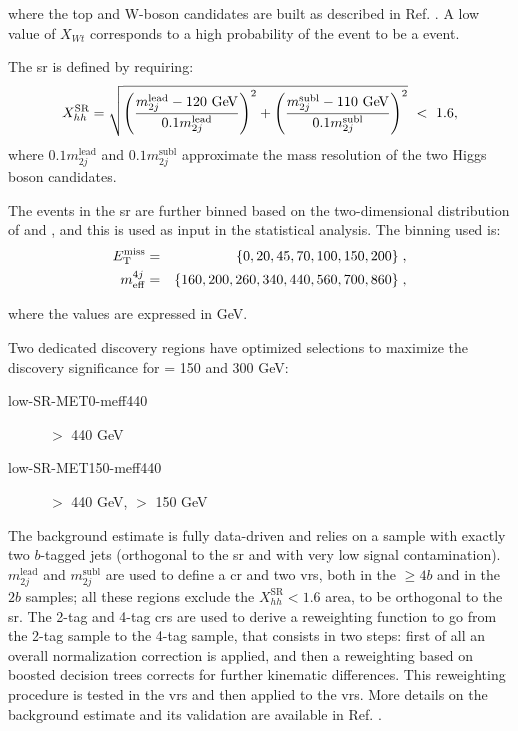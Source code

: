 \noindent where the top and W-boson candidates are built as described in Ref. \cite{Aaboud:2018htj}. 
A low value of $X_{Wt}$ corresponds to a high probability of the event to be a \ttbar event. 

The \gls{sr} is defined by requiring: 
\begin{equation}
X_{hh}^\textrm{SR} = \sqrt{ \left( \frac{m_{2j}^\textrm{lead} - 120\ \text{Ge\kern -0.1em V}}{0.1 m_{2j}^\textrm{lead}} \right)^2 + \left( \frac{m_{2j}^\textrm{subl} - 110\ \text{Ge\kern -0.1em V}}{0.1 m_{2j}^\textrm{subl}} \right)^2} \ <\ 1.6,
\end{equation}
\noindent where $0.1  m_{2j}^\textrm{lead}$ and $0.1 m_{2j}^\textrm{subl}$ approximate the mass resolution of the two Higgs 
boson candidates. 

The events in the \gls{sr} are further binned based on the two-dimensional distribution of \met and \meff, 
and this is used as input in the statistical analysis. The binning used is:
\begin{eqnarray*} 
E_{\rm T}^{\mathrm{miss}} &=& \{0, 20, 45, 70, 100, 150, 200\} \;, \\
m_{\mathrm{eff}}^{4j} &=&\{160, 200, 260, 340, 440, 560, 700, 860\} \;,
\end{eqnarray*}

\noindent where the values are expressed in GeV.

Two dedicated discovery regions have optimized selections to maximize the discovery significance for \mhino = 150 and 300 GeV:
\begin{description}
\item[low-SR-MET0-meff440] \meffb $>$ 440 GeV
\item[low-SR-MET150-meff440] \meffb $>$ 440 GeV, \met $>$ 150 GeV
\end{description}

The background estimate is fully data-driven and relies on a sample with exactly two $b$-tagged jets (orthogonal to the \gls{sr} and 
with very low signal contamination). $m_{2j}^\textrm{lead}$ and $m_{2j}^\textrm{subl}$ are used to define a \gls{cr} and two \glspl{vr}, both in the $\geq4b$ and in the $2b$ samples; all these regions exclude the $X_{hh}^\textrm{SR}<1.6$ area, to be orthogonal to the \gls{sr}.
The 2-tag and 4-tag \glspl{cr} are used to derive a reweighting function to go from the 2-tag sample to the 4-tag sample, that consists in two steps:
first of all an overall normalization correction is applied, and then 
a reweighting based on boosted decision trees corrects for further kinematic differences. 
This reweighting procedure is tested in the \glspl{vr} and then applied to the \glspl{vr}.
More details on the background estimate and its validation are available in Ref. \cite{Aaboud:2018htj}.

